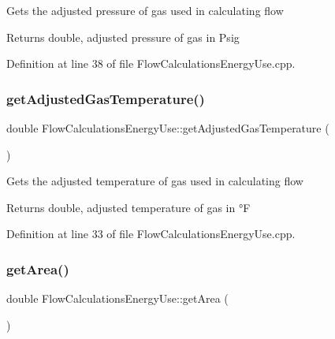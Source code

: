 Gets the adjusted pressure of gas used in calculating flow

\begin{DoxyReturn}{Returns}
double, adjusted pressure of gas in Psig 
\end{DoxyReturn}


Definition at line 38 of file Flow\+Calculations\+Energy\+Use.\+cpp.

\mbox{\label{class_flow_calculations_energy_use_a6efdcd6364e01577dda38dc49601df53}} 
\subsubsection{\texorpdfstring{get\+Adjusted\+Gas\+Temperature()}{getAdjustedGasTemperature()}}
{\footnotesize\ttfamily double Flow\+Calculations\+Energy\+Use\+::get\+Adjusted\+Gas\+Temperature (\begin{DoxyParamCaption}{ }\end{DoxyParamCaption})}

Gets the adjusted temperature of gas used in calculating flow

\begin{DoxyReturn}{Returns}
double, adjusted temperature of gas in °F 
\end{DoxyReturn}


Definition at line 33 of file Flow\+Calculations\+Energy\+Use.\+cpp.

\mbox{\label{class_flow_calculations_energy_use_a2cfdefc20dcc3d1c5b7d3d12e66b67ee}} 
\subsubsection{\texorpdfstring{get\+Area()}{getArea()}}
{\footnotesize\ttfamily double Flow\+Calculations\+Energy\+Use\+::get\+Area (\begin{DoxyParamCaption}{ }\end{DoxyParamCaption})}

